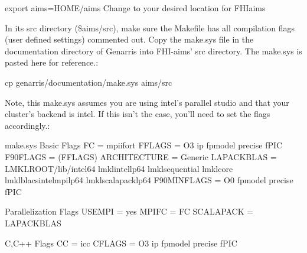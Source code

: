 \documentclass[letterpaper,10pt,english]{sphinxmanual}
\begin{document}
\begin{sphinxVerbatim}[commandchars=\\\{\}]
export \PYGZdl{}aims=\PYGZdl{}\PYGZob{}HOME\PYGZcb{}/aims  \PYGZsh{}Change to your desired location for FHI\PYGZhy{}aims
\end{sphinxVerbatim}

In its src directory (\$aims/src), make sure the Makefile has all compilation
flags (user defined settings) commented out.
Copy the make.sys file in the documentation directory of Genarris into
FHI-aims' src directory. The make.sys is pasted here for reference.:

\begin{sphinxVerbatim}[commandchars=\\\{\}]
cp \PYGZdl{}genarris/documentation/make.sys \PYGZdl{}aims/src
\end{sphinxVerbatim}

Note, this make.sys assumes you are using intel's parallel studio and that your
cluster's backend is intel. If this isn't the case, you'll need to set the
flags accordingly.:

\begin{sphinxVerbatim}[commandchars=\\\{\}]
\PYGZsh{} make.sys
\PYGZsh{}\PYGZsh{}\PYGZsh{}\PYGZsh{}\PYGZsh{}\PYGZsh{}\PYGZsh{}\PYGZsh{}\PYGZsh{}\PYGZsh{}\PYGZsh{}\PYGZsh{}\PYGZsh{}\PYGZsh{}\PYGZsh{}
\PYGZsh{} Basic Flags \PYGZsh{}
\PYGZsh{}\PYGZsh{}\PYGZsh{}\PYGZsh{}\PYGZsh{}\PYGZsh{}\PYGZsh{}\PYGZsh{}\PYGZsh{}\PYGZsh{}\PYGZsh{}\PYGZsh{}\PYGZsh{}\PYGZsh{}\PYGZsh{}
FC = mpiifort
FFLAGS = \PYGZhy{}O3 \PYGZhy{}ip \PYGZhy{}fp\PYGZhy{}model precise \PYGZhy{}fPIC
F90FLAGS = \PYGZdl{}(FFLAGS)
ARCHITECTURE = Generic
LAPACKBLAS = \PYGZhy{}L\PYGZdl{}\PYGZob{}MKLROOT\PYGZcb{}/lib/intel64 \PYGZbs{}
             \PYGZhy{}lmkl\PYGZus{}intel\PYGZus{}lp64 \PYGZbs{}
             \PYGZhy{}lmkl\PYGZus{}sequential \PYGZbs{}
             \PYGZhy{}lmkl\PYGZus{}core \PYGZbs{}
             \PYGZhy{}lmkl\PYGZus{}blacs\PYGZus{}intelmpi\PYGZus{}lp64 \PYGZbs{}
             \PYGZhy{}lmkl\PYGZus{}scalapack\PYGZus{}lp64
F90MINFLAGS = \PYGZhy{}O0 \PYGZhy{}fp\PYGZhy{}model precise \PYGZhy{}fPIC

\PYGZsh{}\PYGZsh{}\PYGZsh{}\PYGZsh{}\PYGZsh{}\PYGZsh{}\PYGZsh{}\PYGZsh{}\PYGZsh{}\PYGZsh{}\PYGZsh{}\PYGZsh{}\PYGZsh{}\PYGZsh{}\PYGZsh{}\PYGZsh{}\PYGZsh{}\PYGZsh{}\PYGZsh{}\PYGZsh{}\PYGZsh{}\PYGZsh{}\PYGZsh{}\PYGZsh{}\PYGZsh{}
\PYGZsh{} Parallelization Flags \PYGZsh{}
\PYGZsh{}\PYGZsh{}\PYGZsh{}\PYGZsh{}\PYGZsh{}\PYGZsh{}\PYGZsh{}\PYGZsh{}\PYGZsh{}\PYGZsh{}\PYGZsh{}\PYGZsh{}\PYGZsh{}\PYGZsh{}\PYGZsh{}\PYGZsh{}\PYGZsh{}\PYGZsh{}\PYGZsh{}\PYGZsh{}\PYGZsh{}\PYGZsh{}\PYGZsh{}\PYGZsh{}\PYGZsh{}
USE\PYGZus{}MPI = yes
MPIFC = \PYGZdl{}\PYGZob{}FC\PYGZcb{}
SCALAPACK = \PYGZdl{}\PYGZob{}LAPACKBLAS\PYGZcb{}

\PYGZsh{}\PYGZsh{}\PYGZsh{}\PYGZsh{}\PYGZsh{}\PYGZsh{}\PYGZsh{}\PYGZsh{}\PYGZsh{}\PYGZsh{}\PYGZsh{}\PYGZsh{}\PYGZsh{}\PYGZsh{}\PYGZsh{}
\PYGZsh{} C,C++ Flags \PYGZsh{}
\PYGZsh{}\PYGZsh{}\PYGZsh{}\PYGZsh{}\PYGZsh{}\PYGZsh{}\PYGZsh{}\PYGZsh{}\PYGZsh{}\PYGZsh{}\PYGZsh{}\PYGZsh{}\PYGZsh{}\PYGZsh{}\PYGZsh{}
CC = icc
CFLAGS = \PYGZhy{}O3 \PYGZhy{}ip \PYGZhy{}fp\PYGZhy{}model precise \PYGZhy{}fPIC
\end{sphinxVerbatim}
\end{document}
